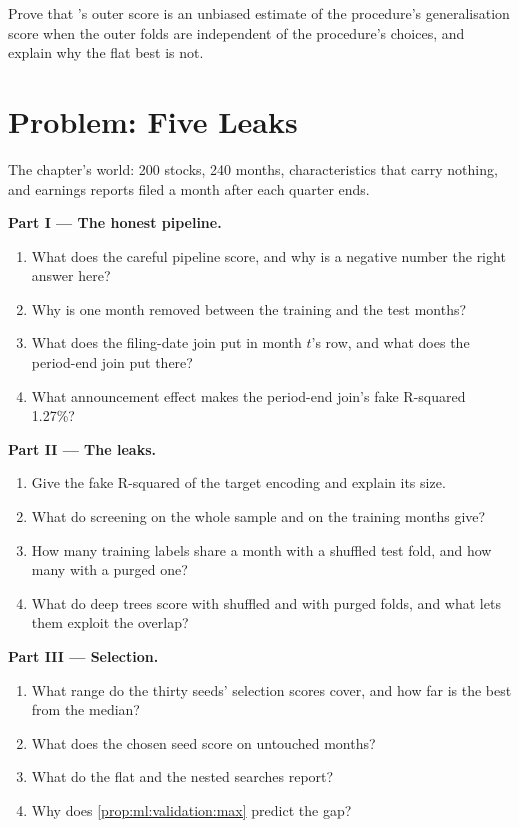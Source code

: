 \begin{exercise}[$\star\star\star$]\label{exo:ml:validation:8}
Prove that 's outer score is an unbiased estimate of the procedure's generalisation score when
the outer folds are independent of the procedure's choices, and explain why the flat best is not.
\end{exercise}

\section{Problem: Five Leaks}

\begin{problem}\label{pb:ml:validation:1}
The chapter's world: 200 stocks, 240 months, characteristics that carry nothing, and earnings reports filed a month
after each quarter ends.

\medskip\noindent\textbf{Part I --- The honest pipeline.}
\begin{enumerate}
\item What does the careful pipeline score, and why is a negative number the right answer here?
\item Why is one month removed between the training and the test months?
\item What does the filing-date join put in month $t$'s row, and what does the period-end join put there?
\item What announcement effect makes the period-end join's fake R-squared 1.27\%?
\end{enumerate}

\medskip\noindent\textbf{Part II --- The leaks.}
\begin{enumerate}[resume]
\item Give the fake R-squared of the target encoding and explain its size.
\item What do screening on the whole sample and on the training months give?
\item How many training labels share a month with a shuffled test fold, and how many with a purged one?
\item What do deep trees score with shuffled and with purged folds, and what lets them exploit the overlap?
\end{enumerate}

\medskip\noindent\textbf{Part III --- Selection.}
\begin{enumerate}[resume]
\item What range do the thirty seeds' selection scores cover, and how far is the best from the median?
\item What does the chosen seed score on untouched months?
\item What do the flat and the nested searches report?
\item Why does \cref{prop:ml:validation:max} predict the gap?
\end{enumerate}


\end{problem}
